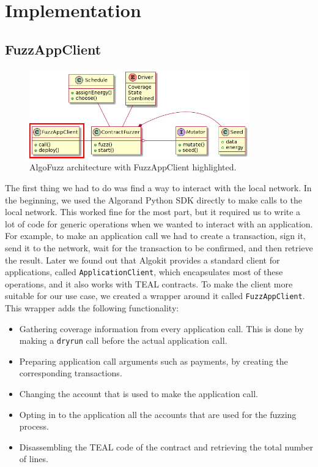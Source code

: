 \section{Implementation} \label{section:implementation}

\subsection*{FuzzAppClient}

\begin{figure}[htbp]
    \centering
    \includegraphics[width=0.85\textwidth]{figures/arc-client.png}
    \caption{AlgoFuzz architecture with FuzzAppClient highlighted.}\label{fig:architecture-client}
\end{figure}

The first thing we had to do was find a way to interact with the local network.
In the beginning, we used the Algorand Python \acs{SDK} directly to make calls to the local network.
This worked fine for the most part, but it required us to write a lot of code for generic operations when we wanted to interact with an application.
For example, to make an application call we had to create a transaction, sign it, send it to the network, wait for the transaction to be confirmed, and then retrieve the result.
Later we found out that Algokit provides a standard client for applications, called \texttt{ApplicationClient}, which encapsulates most of these operations, and it also works with \ac{TEAL} contracts.
To make the client more suitable for our use case, we created a wrapper around it called \texttt{FuzzAppClient}.
This wrapper adds the following functionality:
\begin{itemize}
    \item Gathering coverage information from every application call. This is done by making a \texttt{dryrun} call before the actual application call.
    \item Preparing application call arguments such as payments, by creating the corresponding transactions.
    \item Changing the account that is used to make the application call.
    \item Opting in to the application all the accounts that are used for the fuzzing process.
    \item Disassembling the \ac{TEAL} code of the contract and retrieving the total number of lines.
\end{itemize}


